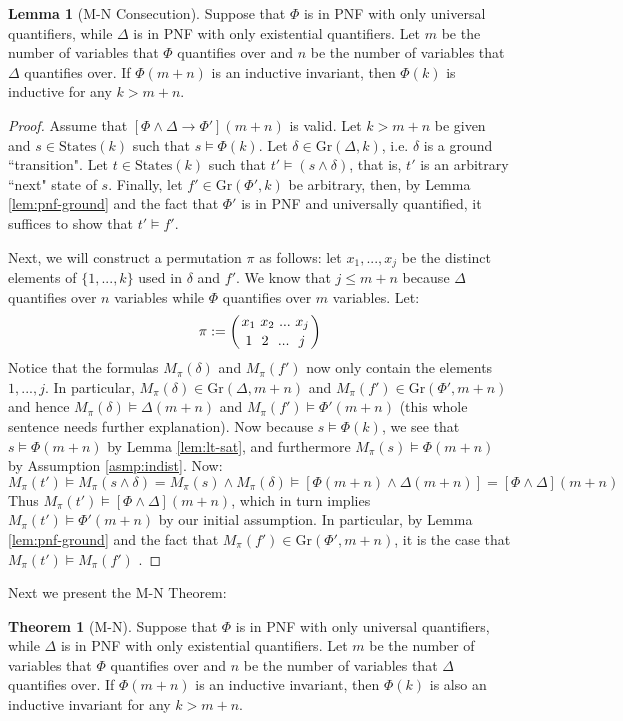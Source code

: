 \documentclass[12pt]{article}
\theoremstyle{definition}
\newtheorem{lemma}{Lemma}
\newtheorem{theorem}{Theorem}
\theoremstyle{remark}
\newcommand{\msp}{\text{ }}
\newcommand{\states}{\text{States}}
\newcommand{\gr}{\text{Gr}}
\newcommand{\perm}{\genfrac{}{}{0pt}{}}
\begin{document}
\begin{lemma}[M-N Consecution]
  Suppose that $\Phi$ is in PNF with only universal quantifiers, while $\Delta$ is in PNF with only existential quantifiers.  Let $m$ be the number of variables that $\Phi$ quantifies over and $n$ be the number of variables that $\Delta$ quantifies over.  If $\Phi(m+n)$ is an inductive invariant, then $\Phi(k)$ is inductive for any $k>m+n$.
\end{lemma}
\begin{proof}
  Assume that $[\Phi\land\Delta \rightarrow \Phi'](m+n)$ is valid.  Let $k>m+n$ be given and $s \in \states(k)$ such that $s \models \Phi(k)$.  Let $\delta \in \gr(\Delta,k)$, i.e. $\delta$ is a ground ``transition".  Let $t \in \states(k)$ such that $t' \models (s \land \delta)$, that is, $t'$ is an arbitrary ``next" state of $s$.  Finally, let $f' \in \gr(\Phi',k)$ be arbitrary, then, by Lemma \ref{lem:pnf-ground} and the fact that $\Phi'$ is in PNF and universally quantified, it suffices to show that $t' \models f'$.

  Next, we will construct a permutation $\pi$ as follows: let $x_1,...,x_j$ be the distinct elements of $\{1,...,k\}$ used in $\delta$ and $f'$.  We know that $j \leq m+n$ because $\Delta$ quantifies over $n$ variables while $\Phi$ quantifies over $m$ variables.  Let:
  $$\pi := \left( \perm{x_1 \msp x_2 \msp ... \msp x_j}{1 \msp\msp 2 \msp\msp ... \msp\msp j} \right)$$
  Notice that the formulas $M_\pi(\delta)$ and $M_\pi(f')$ now only contain the elements $1,...,j$.  In particular, $M_\pi(\delta) \in \gr(\Delta,m+n)$ and $M_\pi(f') \in \gr(\Phi',m+n)$ and hence $M_\pi(\delta) \models \Delta(m+n)$ and $M_\pi(f') \models \Phi'(m+n)$ (this whole sentence needs further explanation).  Now because $s \models \Phi(k)$, we see that $s \models \Phi(m+n)$ by Lemma \ref{lem:lt-sat}, and furthermore $M_\pi(s) \models \Phi(m+n)$ by Assumption \ref{asmp:indist}.  Now:
  $$M_\pi(t') \models M_\pi(s \land \delta) = M_\pi(s) \land M_\pi(\delta) \models [\Phi(m+n) \land \Delta(m+n)] = [\Phi\land\Delta](m+n)$$
  Thus $M_\pi(t') \models [\Phi\land\Delta](m+n)$, which in turn implies $M_\pi(t') \models \Phi'(m+n)$ by our initial assumption.  In particular, by Lemma \ref{lem:pnf-ground} and the fact that $M_\pi(f') \in \gr(\Phi',m+n)$, it is the case that $M_\pi(t') \models M_\pi(f')$ .
\end{proof}

Next we present the M-N Theorem:

\begin{theorem}[M-N]
  Suppose that $\Phi$ is in PNF with only universal quantifiers, while $\Delta$ is in PNF with only existential quantifiers.  Let $m$ be the number of variables that $\Phi$ quantifies over and $n$ be the number of variables that $\Delta$ quantifies over.  If $\Phi(m+n)$ is an inductive invariant, then $\Phi(k)$ is also an inductive invariant for any $k>m+n$.
\end{theorem}
\end{document}
